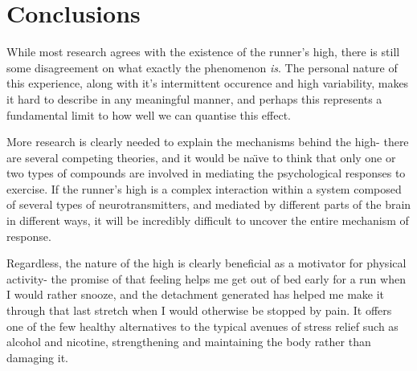 \documentclass[]{article}
\begin{document}
\section{Conclusions}

	While most research agrees with the existence of the runner's high, there is still some disagreement on what exactly the phenomenon \emph{is}. The personal nature of this experience, along with it's intermittent occurence and high variability, makes it hard to describe in any meaningful manner, and perhaps this represents a fundamental limit to how well we can quantise this effect.
	
	More research is clearly needed to explain the mechanisms behind the high- there are several competing theories, and it would be na\"{\i}ve to think that only one or two types of compounds are involved in mediating the psychological responses to exercise. If the runner's high is a complex interaction within a system composed of several types of neurotransmitters, and mediated by different parts of the brain in different ways, it will be incredibly difficult to uncover the entire mechanism of response.
	
	Regardless, the nature of the high is clearly beneficial as a motivator for physical activity- the promise of that feeling helps me get out of bed early for a run when I would rather snooze, and the detachment generated has helped me make it through that last stretch when I would otherwise be stopped by pain. It offers one of the few healthy alternatives to the typical avenues of stress relief such as alcohol and nicotine, strengthening and maintaining the body rather than damaging it.



\end{document}
